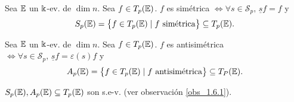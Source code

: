 \begin{defi}
    Sea $\mathbb{E}$ un $\Bbbk$-ev. de $\dim n$. Sea $f \in T_p(\mathbb{E})$. $f$ es simétrica $\iff \forall s \in \mathcal{S}_p,\, \underline{s}f = f$ y
    \[
		S_p(\mathbb{E}) = \left\{f \in T_p(\mathbb{E}) \mid f \text{ simétrica}\right\} \subseteq T_p(\mathbb{E}).
    \]
\end{defi}
\begin{defi}
	Sea $\mathbb{E}$ un $\Bbbk$-ev. de $\dim n$. Sea $f \in T_p(\mathbb{E})$. $f$ es antisimétrica $\iff \forall s \in \mathcal{S}_p,\, \underline{s}f
            = \varepsilon (s) f$ y 
	\[
		A_p(\mathbb{E}) = \left\{f \in T_p(\mathbb{E}) \mid f \text{ antisimétrica}\right\} \subseteq T_P(\mathbb{E}).
	\]
\end{defi}
\begin{obs}
    $S_p(\mathbb{E}), A_p(\mathbb{E}) \subseteq T_p(\mathbb{E})$ son s.e-v. (ver observación \ref{obs_1.6.1}).
\end{obs}
